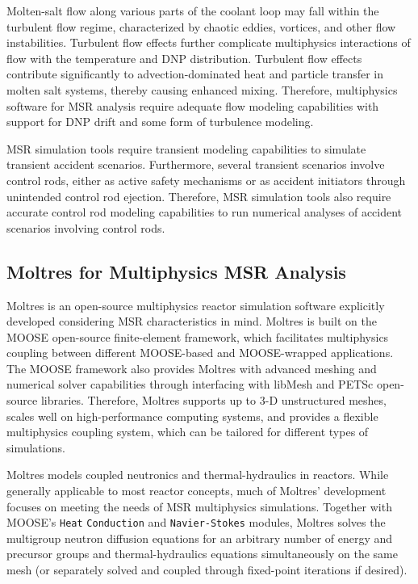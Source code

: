 Molten-salt flow along various parts of the coolant loop may fall within the turbulent flow
regime, characterized by chaotic eddies, vortices, and other flow instabilities.
Turbulent flow effects further complicate multiphysics interactions of flow with the temperature
and \gls{DNP} distribution. Turbulent flow effects contribute significantly to advection-dominated
heat and particle transfer in molten salt systems, thereby causing enhanced mixing. Therefore,
multiphysics software for \gls{MSR} analysis require adequate flow modeling capabilities with
support for \gls{DNP} drift and some form of turbulence modeling.

\gls{MSR} simulation tools require transient modeling capabilities to simulate transient
accident scenarios. Furthermore, several transient scenarios involve control rods, either as active
safety mechanisms or as accident initiators through unintended control rod ejection. Therefore,
\gls{MSR} simulation tools also require accurate control rod modeling capabilities to run
numerical analyses of accident scenarios involving control rods.

\subsection{Moltres for Multiphysics \gls{MSR} Analysis}

Moltres \cite{lindsay_moltres_2017} is an open-source multiphysics reactor simulation software
explicitly developed considering \gls{MSR} characteristics in mind. Moltres is
built on the \gls{MOOSE} \cite{giudicelli_30_2024} open-source finite-element framework,
which facilitates multiphysics coupling between different
\gls{MOOSE}-based and \gls{MOOSE}-wrapped applications. The \gls{MOOSE} framework also provides
Moltres with advanced meshing and numerical solver capabilities through interfacing with libMesh
\cite{kirk_libmesh_2006} and PETSc \cite{satish_petsc_2019} open-source libraries. Therefore,
Moltres supports up to 3-D unstructured meshes, scales well on high-performance computing systems,
and provides a flexible multiphysics coupling system, which can be tailored for different types of
simulations.

Moltres models coupled neutronics and thermal-hydraulics in reactors. While
generally applicable to most reactor concepts, much of
Moltres' development focuses on meeting the needs of \gls{MSR} multiphysics simulations.
Together with \gls{MOOSE}'s \texttt{Heat}
\texttt{Conduction} and \texttt{Navier-Stokes} \cite{peterson_overview_2018}
modules, Moltres solves the multigroup neutron diffusion
equations for an arbitrary number of energy and precursor groups and
thermal-hydraulics equations simultaneously on the same mesh (or separately solved and coupled
through fixed-point iterations if desired).

